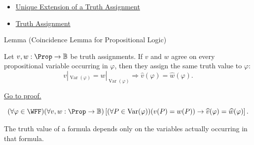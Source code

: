 \begin{dependencies}
\begin{itemize}
  \item \hyperref[thm:unique-extension-truth-assignment-propositional-logic]{Unique Extension of a Truth Assignment}
  \item \hyperref[def:truth-assignment-propositional-logic]{Truth Assignment}
\end{itemize}
\end{dependencies}
\begin{lemmabox}{Lemma (Coincidence Lemma for Propositional Logic)}
\begin{lemma}
\label{lem:coincidence-lemma-propositional-logic}
Let \(v,w:\Prop\to\mathbb{B}\) be truth assignments. If \(v\) and \(w\) agree on every propositional variable occurring in \(\varphi\), then they assign the same truth value to \(\varphi\):
\[
v|_{\operatorname{Var}(\varphi)}
=
w|_{\operatorname{Var}(\varphi)}
\Longrightarrow
\widehat v(\varphi)=\widehat w(\varphi).
\]

\noindent\hyperref[prf:coincidence-lemma-propositional-logic]{Go to proof.}
\end{lemma}
\end{lemmabox}

\begin{remark*}
\[
(\forall\varphi\in\WFF)
(\forall v,w:\Prop\to\mathbb{B})
\left[
(\forall P\in\operatorname{Var}(\varphi))(v(P)=w(P))
\to
\widehat v(\varphi)=\widehat w(\varphi)
\right].
\]
\end{remark*}

\begin{remark*}[Interpretation]
The truth value of a formula depends only on the variables actually occurring in that formula.
\end{remark*}

